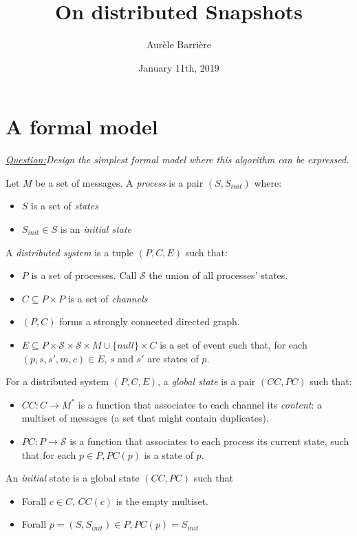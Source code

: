 \documentclass{article}
\title{On distributed Snapshots}
\author{Aur\`ele Barri\`ere}
\date{January 11th, 2019}
\begin{document}
\maketitle

\def\q#1{\textit{\underline{Question:}#1}}

\section{A formal model}
\q{Design the simplest formal model where this algorithm can be expressed.}

Let $M$ be a set of messages. 
A \textit{process} is a pair $(S,S_{init})$ where:
\begin{itemize}
\item $S$ is a set of \textit{states}
\item $S_{init}\in S$ is an \textit{initial state}
\end{itemize}

A \textit{distributed system} is a tuple $(P,C,E)$ such that:
\begin{itemize}
\item $P$ is a set of processes. Call $\mathcal{S}$ the union of all processes' states.
\item $C\subseteq P\times P$ is a set of \textit{channels}
\item $(P,C)$ forms a strongly connected directed graph.
\item $E\subseteq P\times \mathcal{S}\times \mathcal{S}\times M\cup\{null\}\times C$ is a set of event such that, for each $(p,s,s',m,c)\in E$, $s$ and $s'$ are states of $p$.
\end{itemize}

For a distributed system $(P,C,E)$, a \textit{global state} is a pair $(CC,PC)$ such that:
\begin{itemize}
\item $CC: C\rightarrow M^*$ is a function that associates to each channel its \textit{content}: a multiset of messages (a set that might contain duplicates).
\item $PC: P \rightarrow \mathcal{S}$ is a function that associates to each process its current state, such that for each $p\in P, PC(p)$ is a state of $p$.
\end{itemize}

An \textit{initial} state is a global state $(CC,PC)$ such that
\begin{itemize}
\item Forall $c\in C$, $CC(c)$ is the empty multiset.
\item Forall $p=(S,S_{init})\in P, PC(p)=S_{init}$
\end{itemize}
\end{document}
